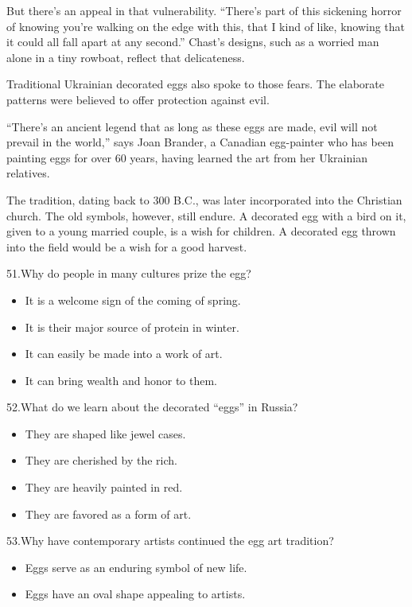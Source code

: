 \documentclass[UTF8,11pt]{ctexart}
\begin{document}
But there’s an appeal in that vulnerability. “There’s part of this sickening horror of knowing you’re walking on the edge with this, that I kind of like, knowing that it could all fall apart at any second.” Chast’s designs, such as a worried man alone in a tiny rowboat, reflect that delicateness.


Traditional Ukrainian decorated eggs also spoke to those fears. The elaborate patterns were believed to offer protection against evil.


“There’s an ancient legend that as long as these eggs are made, evil will not prevail in the world,” says Joan Brander, a Canadian egg-painter who has been painting eggs for over 60 years, having learned the art from her Ukrainian relatives.


The tradition, dating back to 300 B.C., was later incorporated into the Christian church. The old symbols, however, still endure. A decorated egg with a bird on it, given to a young married couple, is a wish for children. A decorated egg thrown into the field would be a wish for a good harvest.


51.Why do people in many cultures prize the egg?


\begin{itemize}[leftmargin=2em,itemsep=.2em,topsep=.4em]\item[A.] It is a welcome sign of the coming of spring.
\item[B.] It is their major source of protein in winter.
\item[C.] It can easily be made into a work of art.
\item[D.] It can bring wealth and honor to them.
\end{itemize}

52.What do we learn about the decorated “eggs” in Russia?


\begin{itemize}[leftmargin=2em,itemsep=.2em,topsep=.4em]\item[A.] They are shaped like jewel cases.
\item[B.] They are cherished by the rich.
\item[C.] They are heavily painted in red.
\item[D.] They are favored as a form of art.
\end{itemize}

53.Why have contemporary artists continued the egg art tradition?


\begin{itemize}[leftmargin=2em,itemsep=.2em,topsep=.4em]\item[A.] Eggs serve as an enduring symbol of new life.
\item[B.] Eggs have an oval shape appealing to artists.
\end{itemize}
\end{document}

